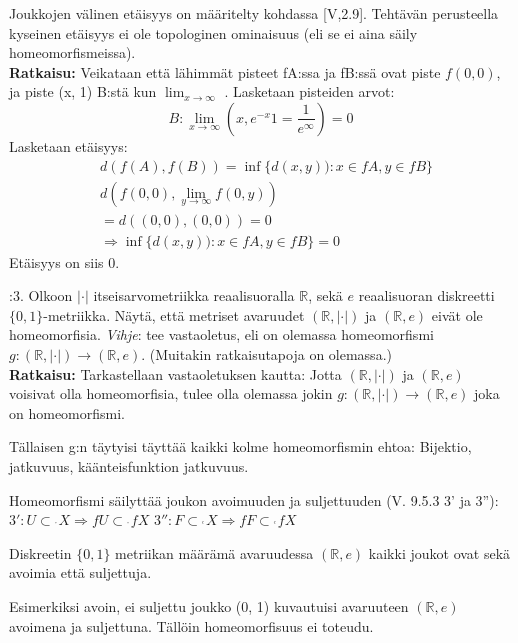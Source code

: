 \documentclass[12pt,a4paper,leqno]{amsart}
\newcommand{\css}{\operatorname{\subset\!\!\!\!_{^{^c}}}}
\newcommand{\oss}{\operatorname{\subset\!\!\!\!_{^{^\circ}}}}
\begin{document}
Joukkojen välinen etäisyys on määritelty kohdassa [V,2.9]. Tehtävän perusteella kyseinen  etäisyys ei
ole topologinen ominaisuus (eli se ei aina säily homeomorfismeissa).
\\
\textbf{Ratkaisu:}
Veikataan että lähimmät pisteet fA:ssa ja fB:ssä ovat piste $f(0, 0)$, ja piste (x, 1) B:stä kun $\lim_{x \to \infty}$ . Lasketaan pisteiden arvot: 
\[B: \lim_{x \to \infty} (x, e^{-x}1 = \frac{1}{e^{\infty}}) = 0\]
Lasketaan etäisyys: 
\begin{align*}
& d(f(A), f(B)) = \inf \{ d(x, y)) : x \in fA, y \in fB\} \\
& d(f(0, 0), \lim_{y \to \infty} f(0, y)) \\
& = d((0, 0), (0, 0)) = 0 \\
& \Rightarrow \inf \{ d(x, y)) : x \in fA, y \in fB\} = 0
\end{align*}
Etäisyys on siis 0.
\bigskip

:3. Olkoon $\vert \cdot \vert$ itseisarvometriikka reaalisuoralla $\mathbb R$, sekä $e$ reaalisuoran diskreetti $\{0,1\}$-metriikka.
Näytä, että metriset avaruudet $(\mathbb R, \vert \cdot \vert)$ ja $ (\mathbb R,e)$ eivät ole homeomorfisia.
\textit{Vihje}:  tee vastaoletus, eli
on olemassa homeomorfismi $g:   (\mathbb R, \vert \cdot \vert) \to (\mathbb R,e)$. (Muitakin ratkaisutapoja on olemassa.)
\\
\textbf{Ratkaisu:} 
Tarkastellaan vastaoletuksen kautta: Jotta $(\mathbb R, \vert \cdot \vert)$ ja $ (\mathbb R,e)$ voisivat olla homeomorfisia, tulee olla olemassa jokin $g:(\mathbb R, \vert \cdot \vert) \to (\mathbb R,e)$ joka on homeomorfismi.

Tällaisen g:n täytyisi täyttää kaikki kolme homeomorfismin ehtoa: Bijektio, jatkuvuus, käänteisfunktion jatkuvuus.

Homeomorfismi säilyttää joukon avoimuuden ja suljettuuden (V. 9.5.3 3' ja 3''): 
$3':  U \oss X \Rightarrow fU \oss fX$
$3'':  F \css X \Rightarrow fF \css fX$

Diskreetin $\{0, 1\}$ metriikan määrämä avaruudessa $(\mathbb R,e)$ kaikki joukot ovat sekä avoimia että suljettuja. 

Esimerkiksi avoin, ei suljettu joukko (0, 1) kuvautuisi avaruuteen $(\mathbb{R}, e)$ avoimena ja suljettuna. Tällöin homeomorfisuus ei toteudu.

\end{document}
